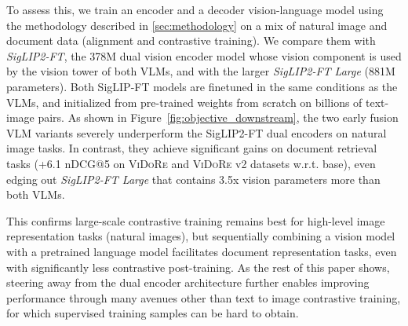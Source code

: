 To assess this, we train an encoder and a decoder vision-language model using the methodology described in \autoref{sec:methodology} on a mix of natural image and document data (alignment and contrastive training). We compare them with \textit{SigLIP2-FT}, the 378M dual vision encoder model whose vision component is used by the vision tower of both VLMs, and with the larger \textit{SigLIP2-FT Large} (881M parameters). Both SigLIP-FT models are finetuned in the same conditions as the VLMs, and initialized from pre-trained weights from scratch on billions of text-image pairs.
As shown in Figure~\ref{fig:objective_downstream}, the two early fusion VLM variants severely underperform the SigLIP2-FT dual encoders on natural image tasks. In contrast, they achieve significant gains on document retrieval tasks (+6.1 nDCG@5 on \textsc{ViDoRe} and \textsc{ViDoRe} v2 datasets w.r.t. base), even edging out \textit{SigLIP2-FT Large} that contains 3.5x vision parameters more than both VLMs.


This confirms large-scale contrastive training remains best for high-level image representation tasks (natural images), but sequentially combining a vision model with a pretrained language model facilitates document representation tasks, even with significantly less contrastive post-training. As the rest of this paper shows, steering away from the dual encoder architecture further enables improving performance through many avenues other than text to image contrastive training, for which supervised training samples can be hard to obtain.



